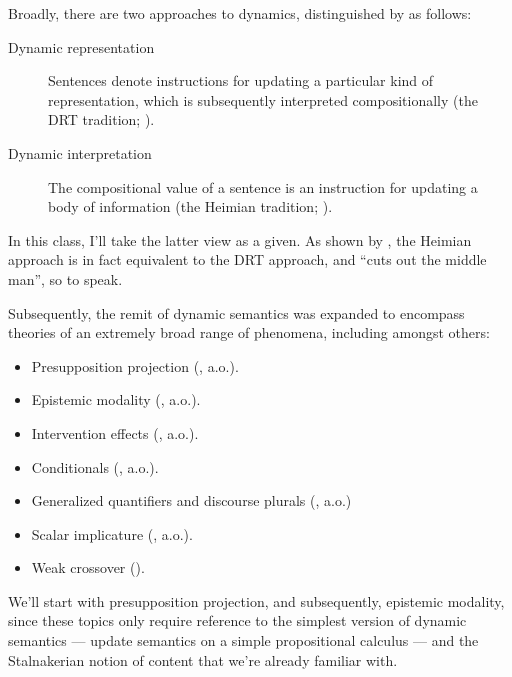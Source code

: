\documentclass[nols,twoside,nofonts,nobib,nohyper]{tufte-handout}
\theoremstyle{definition}
\begin{document}
Broadly, there are two approaches to dynamics, distinguished by \citet{Yalcin2013} as follows:

\begin{description}

    \item[Dynamic representation] Sentences denote instructions for updating a particular kind of representation, which is subsequently interpreted compositionally (the DRT tradition; \citealt{Kamp1981}).

    \item[Dynamic interpretation] The compositional value of a sentence is an instruction for updating a body of information (the Heimian tradition; \citealt{Heim1982}).

\end{description}

In this class, I'll take the latter view as a given. As shown by \citet{GroenendijkStokhof1991}, the Heimian approach is in fact equivalent to the DRT approach, and \enquote{cuts out the middle man}, so to speak.

Subsequently, the remit of dynamic semantics was expanded to encompass theories of an extremely broad range of phenomena, including amongst others:

\begin{itemize}

  \item Presupposition projection (\citealt{Heim1983,Beaver2001}, a.o.).
  \item Epistemic modality (\citealt{Veltman1996,GroenendijkEtAl1996}, a.o.).
  \item Intervention effects (\citealt{Honcoop1998}, a.o.).
  \item Conditionals (\citealt{Gillies2004}, a.o.).
  \item Generalized quantifiers and discourse plurals (\citealt{vandenBerg1996}, a.o.)
  \item Scalar implicature (\citealt{Sudo2019}, a.o.).
  \item Weak crossover (\citealt{Chierchia2020,Elliott2020b}).

\end{itemize}

We'll start with presupposition projection, and subsequently, epistemic modality, since these topics only require reference to the simplest version of dynamic semantics --- update semantics on a simple propositional calculus --- and the Stalnakerian notion of content that we're already familiar with.
\end{document}
